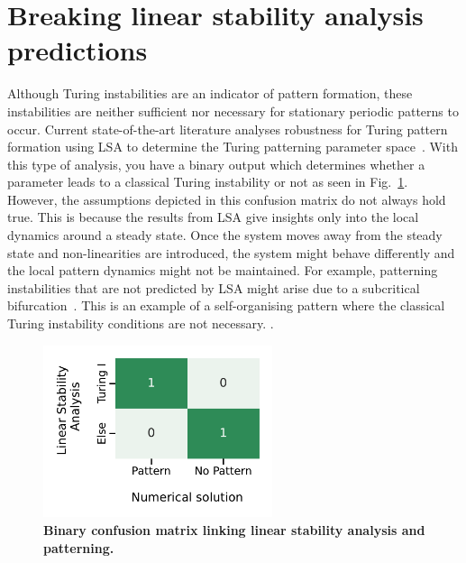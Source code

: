 \section{Breaking linear stability analysis predictions}
Although Turing instabilities are an indicator of pattern formation, these instabilities are neither sufficient nor necessary for stationary periodic patterns to occur.
Current state-of-the-art literature analyses robustness for Turing pattern formation using LSA to determine the Turing patterning parameter space~\parencite{Scholes2019, Zheng2016, Marcon}.
With this type of analysis, you have a binary output which determines whether a parameter leads to a classical Turing instability or not as seen in Fig.~\ref{fig:lsa_numerical_confusion_literature}.
However, the assumptions depicted in this confusion matrix do not always hold true.
This is because the results from LSA give insights only into the local dynamics around a steady state.
Once the system moves away from the steady state and non-linearities are introduced, the system might behave differently and the local pattern dynamics might not be maintained.
For example, patterning instabilities that are not predicted by LSA might arise due to a subcritical bifurcation~\parencite{villar, champneys}.
This is an example of a self-organising pattern where the classical Turing instability conditions are not necessary.
.%

\begin{figure}[H] %
    \centering
    \includegraphics[width=0.6\textwidth]{chapters/Chapter 1/lsa_vs_numerical_confusion_literature} %
    \caption{\textbf{Binary confusion matrix linking linear stability analysis and patterning.}}
    \label{fig:lsa_numerical_confusion_literature} %
\end{figure}


